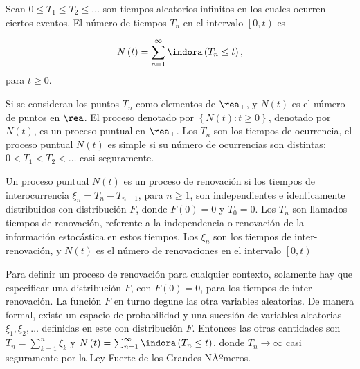 
\begin{Def}%
Sean $0\leq T_{1}\leq T_{2}\leq \ldots$ son tiempos aleatorios infinitos en los cuales ocurren ciertos eventos. El n\'umero de tiempos $T_{n}$ en el intervalo $\left[0,t\right)$ es

\begin{eqnarray}
N\left(t\right)=\sum_{n=1}^{\infty}\indora\left(T_{n}\leq t\right),
\end{eqnarray}
para $t\geq0$.
\end{Def}

Si se consideran los puntos $T_{n}$ como elementos de $\rea_{+}$, y $N\left(t\right)$ es el n\'umero de puntos en $\rea$. El proceso denotado por $\left\{N\left(t\right):t\geq0\right\}$, denotado por $N\left(t\right)$, es un proceso puntual en $\rea_{+}$. Los $T_{n}$ son los tiempos de ocurrencia, el proceso puntual $N\left(t\right)$ es simple si su n\'umero de ocurrencias son distintas: $0<T_{1}<T_{2}<\ldots$ casi seguramente.

\begin{Def}
Un proceso puntual $N\left(t\right)$ es un proceso de renovaci\'on si los tiempos de interocurrencia $\xi_{n}=T_{n}-T_{n-1}$, para $n\geq1$, son independientes e identicamente distribuidos con distribuci\'on $F$, donde $F\left(0\right)=0$ y $T_{0}=0$. Los $T_{n}$ son llamados tiempos de renovaci\'on, referente a la independencia o renovaci\'on de la informaci\'on estoc\'astica en estos tiempos. Los $\xi_{n}$ son los tiempos de inter-renovaci\'on, y $N\left(t\right)$ es el n\'umero de renovaciones en el intervalo $\left[0,t\right)$
\end{Def}


\begin{Note}
Para definir un proceso de renovaci\'on para cualquier contexto, solamente hay que especificar una distribuci\'on $F$, con $F\left(0\right)=0$, para los tiempos de inter-renovaci\'on. La funci\'on $F$ en turno degune las otra variables aleatorias. De manera formal, existe un espacio de probabilidad y una sucesi\'on de variables aleatorias $\xi_{1},\xi_{2},\ldots$ definidas en este con distribuci\'on $F$. Entonces las otras cantidades son $T_{n}=\sum_{k=1}^{n}\xi_{k}$ y $N\left(t\right)=\sum_{n=1}^{\infty}\indora\left(T_{n}\leq t\right)$, donde $T_{n}\rightarrow\infty$ casi seguramente por la Ley Fuerte de los Grandes NÃºmeros.
\end{Note}

